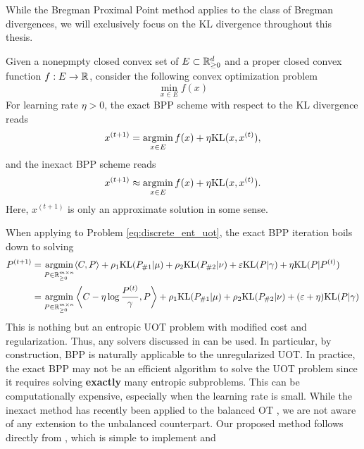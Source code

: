 While the Bregman Proximal Point method \citep{Chen93} applies to the class of Bregman divergences,
we will exclusively focus on the KL divergence throughout this thesis.
\begin{definition}
  Given a nonepmpty closed convex set of $E \subset \mathbb R^d_{\geq 0}$
  and a proper closed convex function $f: E \to \mathbb R$, consider the following
  convex optimization problem
  \begin{equation*}
    \min_{x \in E} f(x)
  \end{equation*}
  For learning rate $\eta > 0$, the exact BPP scheme with respect to the KL divergence reads
  \begin{equation}
    \label{eq:bppa}
    x^{(t+1)} = \operatorname*{argmin}_{x \in E} f(x) + \eta \text{KL}(x, x^{(t)}),
  \end{equation}
  and the inexact BPP scheme reads
  \begin{equation}
    \label{eq:bppa_inexact}
    x^{(t+1)} \approx \operatorname*{argmin}_{x \in E} f(x) + \eta \text{KL}(x, x^{(t)}).
  \end{equation}
  Here, $x^{(t+1)}$ is only an approximate solution in some sense.
\end{definition}
When applying to Problem \ref{eq:discrete_ent_uot}, the exact BPP iteration boils down to solving
\begin{align}
  \label{eq:bpp_uot}
  P^{(t+1)} &= \operatorname*{argmin}_{P \in \mathbb R^{m \times n}_{\geq 0}}
  \langle C, P \rangle + \rho_1 \text{KL}(P_{\# 1} | \mu)
  + \rho_2 \text{KL}(P_{\# 2} | \nu) + \varepsilon \text{KL}(P | \gamma) + \eta \text{KL}(P | P^{(t)}) \\
  &= \operatorname*{argmin}_{P \in \mathbb R^{m \times n}_{\geq 0}}
  \left \langle C - \eta \log \frac{P^{(t)}}{\gamma}, P \right \rangle
  + \rho_1 \text{KL}(P_{\# 1} | \mu) + \rho_2 \text{KL}(P_{\# 2} | \nu) + (\varepsilon + \eta) \text{KL}(P | \gamma)
\end{align}
This is nothing but an entropic UOT problem with modified cost and regularization.
Thus, any solvers discussed in  can be used. In particular,
by construction, BPP is naturally applicable to the unregularized UOT.
In practice, the exact BPP may not be an efficient algorithm to solve the UOT problem since
it requires solving \textbf{exactly} many entropic subproblems. This can be computationally expensive,
especially when the learning rate is small.
While the inexact method has recently been applied to the balanced OT \citep{Xie20,Yang22},
we are not aware of any extension to the unbalanced counterpart.
Our proposed method follows directly from \citep{Xie20}, which is simple to implement and
